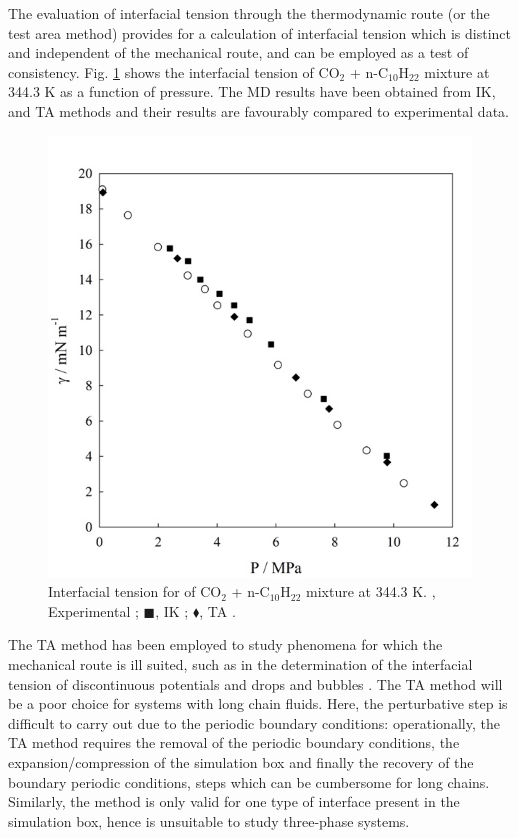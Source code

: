 \documentclass[9pt,bestpractices]{livecoms}
\begin{document}
The evaluation of interfacial tension through the thermodynamic route (or the
test area method) provides for a calculation of interfacial tension which is
distinct and independent of the mechanical route, and can be employed as a test
of consistency. Fig. \ref{fig:21} shows the interfacial tension of CO$_{2}$
+ n-C$_{10}$H$_{22}$ mixture at 344.3 K as a function of pressure. The MD
results have been obtained from IK, and TA methods and their results are
favourably compared to experimental data.
\begin{figure}
\includegraphics[width=0.9\linewidth]{gfx/image67.jpeg}
\caption{Interfacial tension for of CO$_{2}$ + n-C$_{10}$H$_{22}$ mixture at 344.3 K. \textbigcircle, Experimental \citep{mejia2014a}; ${\blacksquare}$, IK \citep{mejia2014a}; $\blacklozenge$, TA \citep{muller2009} .}
\label{fig:21}
\end{figure}
The TA method has been employed to study phenomena for which the mechanical route
is ill suited, such as in the determination of the interfacial tension of
discontinuous potentials \citep{gloor2005}
and drops and bubbles \citep{sampayo2010}. The TA method will be a poor choice
for systems with long chain fluids. Here, the perturbative step is difficult to
carry out due to the periodic boundary conditions: operationally, the TA method
requires the removal of the periodic boundary conditions, the
expansion/compression of the simulation box and finally the recovery of the
boundary periodic conditions, steps which can be cumbersome for long chains.
Similarly, the method is only valid for one type of interface present in the
simulation box, hence is unsuitable to study three-phase systems. 
\end{document}
